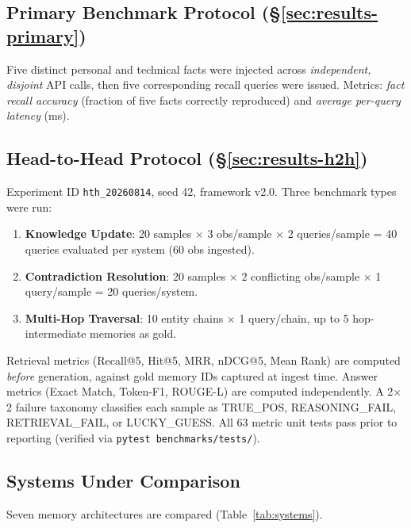 \documentclass[conference]{IEEEtran}
\begin{document}
\subsection{Primary Benchmark Protocol (§\ref{sec:results-primary})}
Five distinct personal and technical facts were injected across
\emph{independent, disjoint} API calls, then five corresponding recall
queries were issued. Metrics: \emph{fact recall accuracy} (fraction of five
facts correctly reproduced) and \emph{average per-query latency} (ms).

\subsection{Head-to-Head Protocol (§\ref{sec:results-h2h})}
Experiment ID \texttt{hth\_20260814}, seed 42, framework v2.0.
Three benchmark types were run:
\begin{enumerate}
  \item \textbf{Knowledge Update}: 20 samples $\times$ 3 obs/sample $\times$
        2 queries/sample = 40 queries evaluated per system (60 obs ingested).
  \item \textbf{Contradiction Resolution}: 20 samples $\times$ 2 conflicting
        obs/sample $\times$ 1 query/sample = 20 queries/system.
  \item \textbf{Multi-Hop Traversal}: 10 entity chains $\times$ 1
        query/chain, up to 5 hop-intermediate memories as gold.
\end{enumerate}

Retrieval metrics (Recall@5, Hit@5, MRR, nDCG@5, Mean Rank) are computed
\emph{before} generation, against gold memory IDs captured at ingest time.
Answer metrics (Exact Match, Token-F1, ROUGE-L) are computed independently.
A 2$\times$2 failure taxonomy classifies each sample as TRUE\_POS,
REASONING\_FAIL, RETRIEVAL\_FAIL, or LUCKY\_GUESS.  All 63 metric unit tests
pass prior to reporting (verified via \texttt{pytest benchmarks/tests/}).

\subsection{Systems Under Comparison}
Seven memory architectures are compared (Table~\ref{tab:systems}).
\end{document}
